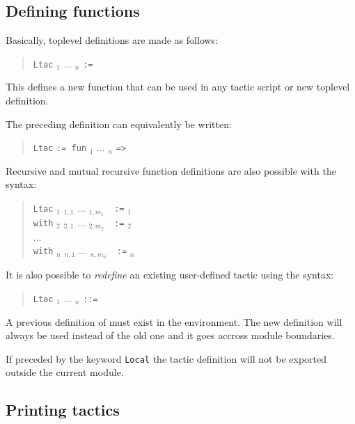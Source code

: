 \subsection{Defining {\ltac} functions}

Basically, {\ltac} toplevel definitions are made as follows:
%
%
\begin{quote}
{\tt Ltac} {\ident} {\ident}$_1$ ... {\ident}$_n$ {\tt :=}
{\tacexpr}
\end{quote}
This defines a new {\ltac} function that can be used in any tactic
script or new {\ltac} toplevel definition.

\Rem The preceding definition can equivalently be written:
\begin{quote}
{\tt Ltac} {\ident} {\tt := fun} {\ident}$_1$ ... {\ident}$_n$
{\tt =>} {\tacexpr}
\end{quote}
Recursive and mutual recursive function definitions are also
possible with the syntax:
\begin{quote}
{\tt Ltac} {\ident}$_1$ {\ident}$_{1,1}$ ...
{\ident}$_{1,m_1}$~~{\tt :=} {\tacexpr}$_1$\\
{\tt with} {\ident}$_2$ {\ident}$_{2,1}$ ... {\ident}$_{2,m_2}$~~{\tt :=}
{\tacexpr}$_2$\\
...\\
{\tt with} {\ident}$_n$ {\ident}$_{n,1}$ ... {\ident}$_{n,m_n}$~~{\tt :=}
{\tacexpr}$_n$
\end{quote}
\medskip
It is also possible to \emph{redefine} an existing user-defined tactic
using the syntax:
\begin{quote}
{\tt Ltac} {\qualid} {\ident}$_1$ ... {\ident}$_n$ {\tt ::=}
{\tacexpr}
\end{quote}
A previous definition of {\qualid} must exist in the environment.
The new definition will always be used instead of the old one and
it goes accross module boundaries.

If preceded by the keyword {\tt Local} the tactic definition will not
be exported outside the current module.

\subsection[Printing {\ltac} tactics]{Printing {\ltac} tactics}

